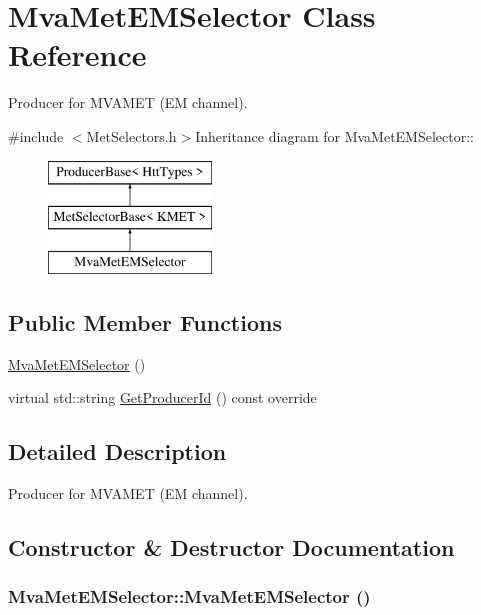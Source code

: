 \hypertarget{classMvaMetEMSelector}{
\section{MvaMetEMSelector Class Reference}
\label{classMvaMetEMSelector}
}


Producer for MVAMET (EM channel).  


{\ttfamily \#include $<$MetSelectors.h$>$}Inheritance diagram for MvaMetEMSelector::\begin{figure}[H]
\begin{center}
\leavevmode
\includegraphics[height=3cm]{classMvaMetEMSelector}
\end{center}
\end{figure}
\subsection*{Public Member Functions}
\begin{DoxyCompactItemize}
\item 
\hyperlink{classMvaMetEMSelector_a6dac2018b394a3614c6fe6919bdbc421}{MvaMetEMSelector} ()
\item 
virtual std::string \hyperlink{classMvaMetEMSelector_a5cc05332a063abfbddcc26fc6754a379}{GetProducerId} () const override
\end{DoxyCompactItemize}


\subsection{Detailed Description}
Producer for MVAMET (EM channel). 

\subsection{Constructor \& Destructor Documentation}
\hypertarget{classMvaMetEMSelector_a6dac2018b394a3614c6fe6919bdbc421}{
\subsubsection[{MvaMetEMSelector}]{\setlength{\rightskip}{0pt plus 5cm}MvaMetEMSelector::MvaMetEMSelector ()}}
\label{classMvaMetEMSelector_a6dac2018b394a3614c6fe6919bdbc421}


